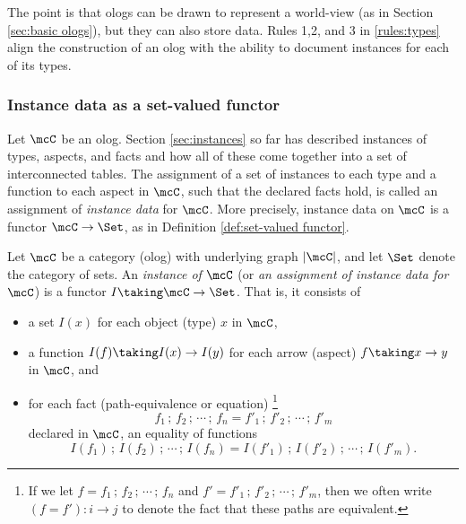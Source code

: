 The point is that ologs can be drawn to represent a world-view (as in Section \ref{sec:basic ologs}), but they can also store data.  Rules 1,2, and 3 in  \ref{rules:types} align the construction of an olog with the ability to document instances for each of its types. 

\setcounter{subsubsection}{1}\subsubsection{Instance data as a set-valued functor}\label{sec:instance data}

Let $\mcC$ be an olog. Section \ref{sec:instances} so far has described instances of types, aspects, and facts and how all of these come together into a set of interconnected tables. The assignment of a set of instances to each type and a function to each aspect in $\mcC$, such that the declared facts hold, is called an assignment of {\em instance data} for $\mcC$. More precisely, instance data on $\mcC$ is a functor $\mcC\to\Set$, as in Definition \ref{def:set-valued functor}. 

\setcounter{theorem}{2}

\begin{definition}\label{def:set-valued functor}

Let $\mcC$ be a category (olog)
with underlying graph $|\mcC|$, 
and let $\Set$ denote the category of sets. 
An {\em instance of $\mcC$} 
(or {\em an assignment of instance data for $\mcC$}) 
is a functor $I\taking\mcC\to\Set$. 
That is, 
it consists of 
\begin{itemize}
\item a set $I(x)$ for each object (type) $x$ in $\mcC$,
\item a function $I(f)\taking I(x)\to I(y)$ for each arrow (aspect) $f\taking x\to y$ in $\mcC$, and 
\item for each fact (path-equivalence or equation) 
%
\footnote{If we let  
$f = f_{1} {\,;\,} f_{2} {\,;\,} \cdots {\,;\,} f_{n}$ and 
$f' = f'_{1} {\,;\,} f'_{2} {\,;\,} \cdots {\,;\,} f'_{m}$,
then we often write $(f = f') \colon i \rightarrow j$ to denote the fact that these paths are equivalent.}
%
$$f_{1} {\,;\,} f_{2} {\,;\,} \cdots {\,;\,} f_{n} = f'_{1} {\,;\,} f'_{2} {\,;\,} \cdots {\,;\,} f'_{m}$$ 
declared in $\mcC$, 
an equality of functions 
$$I(f_{1}) {\,;\,} I(f_{2}) {\,;\,} \cdots {\,;\,} I(f_{n}) = I(f'_{1}) {\,;\,} I(f'_{2}) {\,;\,} \cdots {\,;\,} I(f'_{m}).$$
\end{itemize}

\end{definition}

